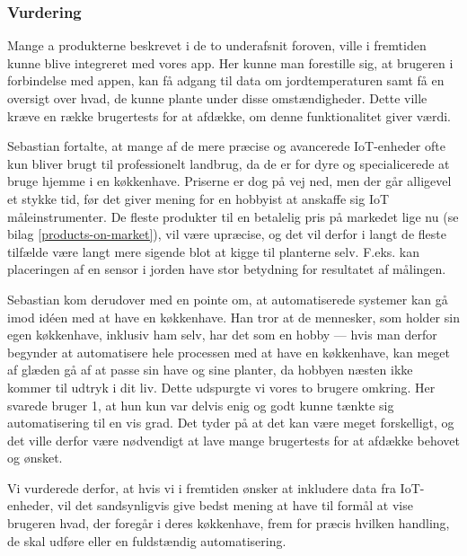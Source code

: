 \subsubsection*{Vurdering}
Mange a produkterne beskrevet i de to underafsnit foroven, ville i fremtiden kunne blive integreret med vores app. Her kunne man forestille sig, at brugeren i forbindelse med appen, kan få adgang til data om jordtemperaturen samt få en oversigt over hvad, de kunne plante under disse omstændigheder. Dette ville kræve en række brugertests for at afdække, om denne funktionalitet giver værdi.

Sebastian fortalte, at mange af de mere præcise og avancerede IoT-enheder ofte kun bliver brugt til professionelt landbrug, da de er for dyre og specialicerede at bruge hjemme i en køkkenhave. Priserne er dog på vej ned, men der går alligevel et stykke tid, før det giver mening for en hobbyist at anskaffe sig IoT måleinstrumenter. De fleste produkter til en betalelig pris på markedet lige nu (se bilag \ref{products-on-market}), vil være upræcise, og det vil derfor i langt de fleste tilfælde være langt mere sigende blot at kigge til planterne selv. F.eks. kan placeringen af en sensor i jorden have stor betydning for resultatet af målingen.

Sebastian kom derudover med en pointe om, at automatiserede systemer kan gå imod idéen med at have en køkkenhave. Han tror at de mennesker, som holder sin egen køkkenhave, inklusiv ham selv, har det som en hobby --- hvis man derfor begynder at automatisere hele processen med at have en køkkenhave, kan meget af glæden gå af at passe sin have og sine planter, da hobbyen næsten ikke kommer til udtryk i dit liv. Dette udspurgte vi vores to brugere omkring. Her svarede bruger 1, at hun kun var delvis enig og godt kunne tænkte sig automatisering til en vis grad. Det tyder på at det kan være meget forskelligt, og det ville derfor være nødvendigt at lave mange brugertests for at afdække behovet og ønsket.

Vi vurderede derfor, at hvis vi i fremtiden ønsker at inkludere data fra IoT-enheder, vil det sandsynligvis give bedst mening at have til formål at vise brugeren hvad, der foregår i deres køkkenhave, frem for præcis hvilken handling, de skal udføre eller en fuldstændig automatisering.
